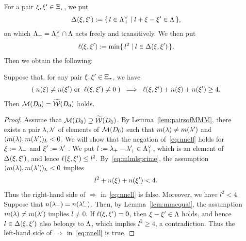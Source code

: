 \documentclass{amsart} %
\begin{document}
%
%
For a pair $\xi, \xi^{\prime}\in \Xi_{\tau}$,
we put
%
\begin{equation}\label{eq:diffellset}
\Delta(\xi, \xi^{\prime}):=
\{\,{l\in \Lambda_{+}^{\vee}}\mid {l+\xi-\xi^{\prime}\in \Lambda} \,\},
\end{equation}
%
on which $\Lambda_{+}= \Lambda_{+}^{\vee}\cap\Lambda$ acts freely and transitively.
We then put 
%
\begin{equation}\label{eq:diffell}
\ell(\xi, \xi^{\prime}):=\min\{\,{l^2}\mid {l\in \Delta(\xi, \xi^{\prime})} \,\}.
\end{equation}
%
Then we obtain the following:
%
\begin{lemma}\label{lem:MMMtilwalls}
Suppose that, for any pair $\xi, \xi^{\prime}\in \Xi_{\tau}$,
we have
%
\begin{equation}\label{eq:nnell}
(\;n(\xi)\ne n(\xi^{\prime}) \; \textrm{\rm or}\; \;\ell(\xi, \xi^{\prime})\ne 0 \;)\;\;\Longrightarrow\;\; \ell(\xi, \xi^{\prime})+n(\xi)+n(\xi^{\prime})\ge 4.
\end{equation}
%
Then $\mathord{\mathcal{M}}(D_0)=\widetilde{\mathord{\mathcal{W}}} (D_0)$ holds.
\end{lemma}
%
\begin{proof}
Assume that $\mathord{\mathcal{M}}(D_0)\supsetneq\widetilde{\mathord{\mathcal{W}}} (D_0)$.
By Lemma~\ref{lem:pairsofMMM},
there exists a pair $\lambda, \lambda^{\prime}$ of elements of $ \mathord{\mathcal{M}}(D_0)$
such that $m(\lambda)\ne m(\lambda^{\prime})$ and $ \langle m(\lambda), m(\lambda^{\prime}) \rangle_{\hskip -1pt L} <0$.
We will show that the negation of~\eqref{eq:nnell} holds for
$\xi:={\lambda}_{-}$ and $\xi^{\prime}:={\lambda}_{-}^{\prime}$.
We put $l:={\lambda}_{+}-{\lambda}_{+}^{\prime}\in \Lambda_{+}^{\vee}$,
which is an element of $\Delta(\xi, \xi^{\prime})$,
and lence $\ell(\xi, \xi^{\prime})\le l^2$.
By~\eqref{eq:mlmlsprime},
the assumption $ \langle m(\lambda), m(\lambda^{\prime}) \rangle_{\hskip -1pt L} <0$ implies 
%
\begin{equation*}\label{eq:lnn}
l^2+n(\xi)+n(\xi^{\prime})<4.
\end{equation*}
%
Thus the right-hand side of $\Longrightarrow$ in~\eqref{eq:nnell} is false.
Moreover, we have $l^2<4$.
Suppose that $n({\lambda}_{-})=n({\lambda}_{-}^{\prime})$.
Then, by Lemma~\ref{lem:mmequal},
the assumption $m(\lambda)\ne m(\lambda^{\prime})$ implies $l\ne 0$.
If $\ell(\xi, \xi^{\prime})= 0$, then 
$\xi-\xi^{\prime}\in \Lambda$ holds, and hence 
$l\in \Delta(\xi, \xi^{\prime})$ also belongs to $\Lambda$,
which implies $l^2\ge 4$, a contradiction.
Thus the left-hand side of $\Longrightarrow$ in~\eqref{eq:nnell} is true.
\end{proof}
\end{document}
